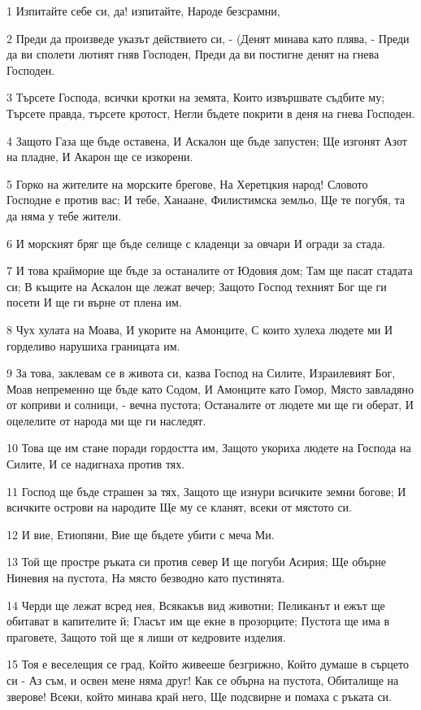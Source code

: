 \par 1 Изпитайте себе си, да! изпитайте, Народе безсрамни,
\par 2 Преди да произведе указът действието си, - (Денят минава като плява, - Преди да ви сполети лютият гняв Господен, Преди да ви постигне денят на гнева Господен.
\par 3 Търсете Господа, всички кротки на земята, Които извършвате съдбите му; Търсете правда, търсете кротост, Негли бъдете покрити в деня на гнева Господен.
\par 4 Защото Газа ще бъде оставена, И Аскалон ще бъде запустен; Ще изгонят Азот на пладне, И Акарон ще се изкорени.
\par 5 Горко на жителите на морските брегове, На Херетцкия народ! Словото Господне е против вас; И тебе, Ханаане, Филистимска земльо, Ще те погубя, та да няма у тебе жители.
\par 6 И морският бряг ще бъде селище с кладенци за овчари И огради за стада.
\par 7 И това крайморие ще бъде за останалите от Юдовия дом; Там ще пасат стадата си; В къщите на Аскалон ще лежат вечер; Защото Господ техният Бог ще ги посети И ще ги върне от плена им.
\par 8 Чух хулата на Моава, И укорите на Амонците, С които хулеха людете ми И горделиво нарушиха границата им.
\par 9 За това, заклевам се в живота си, казва Господ на Силите, Израилевият Бог, Моав непременно ще бъде като Содом, И Амонците като Гомор, Място завладяно от коприви и солници, - вечна пустота; Останалите от людете ми ще ги оберат, И оцелелите от народа ми ще ги наследят.
\par 10 Това ще им стане поради гордостта им, Защото укориха людете на Господа на Силите, И се надигнаха против тях.
\par 11 Господ ще бъде страшен за тях, Защото ще изнури всичките земни богове; И всичките острови на народите Ще му се кланят, всеки от мястото си.
\par 12 И вие, Етиопяни, Вие ще бъдете убити с меча Ми.
\par 13 Той ще простре ръката си против север И ще погуби Асирия; Ще обърне Ниневия на пустота, На място безводно като пустинята.
\par 14 Черди ще лежат всред нея, Всякакъв вид животни; Пеликанът и ежът ще обитават в капителите й; Гласът им ще екне в прозорците; Пустота ще има в праговете, Защото той ще я лиши от кедровите изделия.
\par 15 Тоя е веселещия се град, Който живееше безгрижно, Който думаше в сърцето си - Аз съм, и освен мене няма друг! Как се обърна на пустота, Обиталище на зверове! Всеки, който минава край него, Ще подсвирне и помаха с ръката си.

